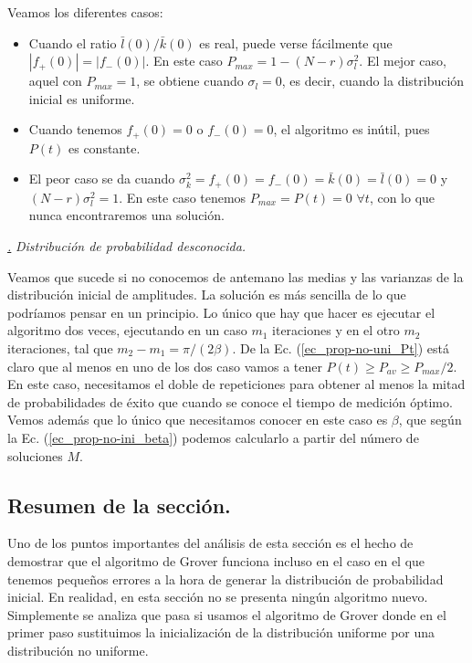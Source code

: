 \documentclass[a4paper,11pt]{book} %
\numberwithin{equation}{chapter}
\def\subsubiContadorIt{\par\addtocounter{subsubsection}{1}\underline{\it\thesubsubsection.}\hskip0.5cm \setcounter{subsubsubsectionIt}{0}}
\newcommand{\SubsubiIt}[1]{
		\subsubiContadorIt \textit{#1}
	}
\newcounter{subsubsubsectionIt}[subsubsection]
\begin{document}
Veamos los diferentes casos:
\begin{itemize}
	\item Cuando el ratio $\bar{l}(0)/\bar{k}(0)$ es real, puede verse fácilmente que $|f_+(0)| =|f_{-}(0)|$. En este caso $P_{max} = 1-(N-r)\sigma_l^2$. El mejor caso, aquel con $P_{max}=1$, se obtiene cuando $\sigma_l=0$, es decir, cuando la distribución inicial es uniforme.
	
	\item Cuando tenemos $f_+(0)=0$ o $f_-(0)=0$, el algoritmo es inútil, pues $P(t)$ es constante.
	
	\item El peor caso se da cuando $\sigma_k^2=f_+(0)=f_-(0)=\bar{k} (0)=\bar{l}(0)=0$ y $(N-r)\sigma_l^2=1$. En este caso tenemos $P_{max}=P(t)=0$ $\forall t$, con lo que nunca encontraremos una solución.
	
\end{itemize}

\SubsubiIt{Distribución de probabilidad desconocida.} \label{sec_sec_subsec_prop-no-uni_desconocida}

Veamos que sucede si no conocemos de antemano las medias y las varianzas de la distribución inicial de amplitudes. 
La solución es más sencilla de lo que podríamos pensar en un principio. Lo único que hay que hacer es ejecutar el algoritmo dos veces, ejecutando en un caso $m_1$ iteraciones y en el otro $m_2$ iteraciones, tal que $m_2-m_1=\pi/(2 \beta)$. De la Ec. (\ref{ec_prop-no-uni_Pt}) está claro que al menos en uno de los dos caso vamos a tener $P(t)\geq P_{av} \geq P_{max}/2$. En este caso, necesitamos el doble de repeticiones para obtener al menos la mitad de probabilidades de éxito que cuando se conoce el tiempo de medición óptimo. Vemos además que lo único que necesitamos conocer en este caso es $\beta$, que según la Ec. (\ref{ec_prop-no-ini_beta}) podemos calcularlo a partir del número de soluciones $M$.


\subsection{Resumen de la sección.}  \label{sec_prop-no-uni_resumen}

Uno de los puntos importantes del análisis de esta sección es el hecho de demostrar que el algoritmo de Grover funciona incluso en el caso en el que tenemos pequeños errores a la hora de generar la distribución de probabilidad inicial. En realidad, en esta sección no se presenta ningún algoritmo nuevo. Simplemente se analiza que pasa si usamos el algoritmo de Grover donde en el primer paso sustituimos la inicialización de la distribución uniforme por una distribución no uniforme.
\end{document}

